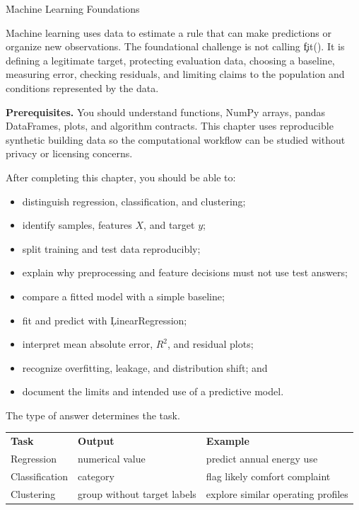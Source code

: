 
\h{Machine Learning Foundations}
\label{ch:18}

Machine learning uses data to estimate a rule that can make predictions or
organize new observations. The foundational challenge is not calling
\c{fit()}. It is defining a legitimate target, protecting evaluation data,
choosing a baseline, measuring error, checking residuals, and limiting claims
to the population and conditions represented by the data.

\begin{NoteBox}
\textbf{Prerequisites.} You should understand functions, NumPy arrays, pandas
DataFrames, plots, and algorithm contracts. This chapter uses reproducible
synthetic building data so the computational workflow can be studied without
privacy or licensing concerns.
\end{NoteBox}

\begin{tcolorbox}[title=Learning outcomes,colframe=orange,colback=white,arc=2mm]
After completing this chapter, you should be able to:
\begin{itemize}
    \item distinguish regression, classification, and clustering;
    \item identify samples, features $X$, and target $y$;
    \item split training and test data reproducibly;
    \item explain why preprocessing and feature decisions must not use test answers;
    \item compare a fitted model with a simple baseline;
    \item fit and predict with \c{LinearRegression};
    \item interpret mean absolute error, $R^2$, and residual plots;
    \item recognize overfitting, leakage, and distribution shift; and
    \item document the limits and intended use of a predictive model.
\end{itemize}
\end{tcolorbox}


The type of answer determines the task.

\begin{center}
\begin{tabular}{lll}
\textbf{Task} & \textbf{Output} & \textbf{Example} \\
Regression & numerical value & predict annual energy use \\
Classification & category & flag likely comfort complaint \\
Clustering & group without target labels & explore similar operating profiles \\
\end{tabular}
\end{center}

